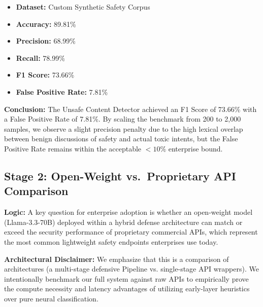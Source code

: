 \documentclass[12pt,a4paper]{article}
\begin{document}
\begin{itemize}
    \item \textbf{Dataset:} Custom Synthetic Safety Corpus
    \item \textbf{Accuracy:} 89.81\%
    \item \textbf{Precision:} 68.99\%
    \item \textbf{Recall:} 78.99\%
    \item \textbf{F1 Score:} 73.66\%
    \item \textbf{False Positive Rate:} 7.81\%
\end{itemize}

\textbf{Conclusion:} The Unsafe Content Detector achieved an F1 Score of 73.66\% with a False Positive Rate of 7.81\%. By scaling the benchmark from 200 to 2,000 samples, we observe a slight precision penalty due to the high lexical overlap between benign discussions of safety and actual toxic intents, but the False Positive Rate remains within the acceptable $<10\%$ enterprise bound.

\subsection{Stage 2: Open-Weight vs.\ Proprietary API Comparison}

\textbf{Logic:} A key question for enterprise adoption is whether an open-weight model (Llama-3.3-70B) deployed within a hybrid defense architecture can match or exceed the security performance of proprietary commercial APIs, which represent the most common lightweight safety endpoints enterprises use today. 

\textbf{Architectural Disclaimer:} We emphasize that this is a comparison of architectures (a multi-stage defensive Pipeline vs. single-stage API wrappers). We intentionally benchmark our full system against raw APIs to empirically prove the compute necessity and latency advantages of utilizing early-layer heuristics over pure neural classification.
\end{document}
